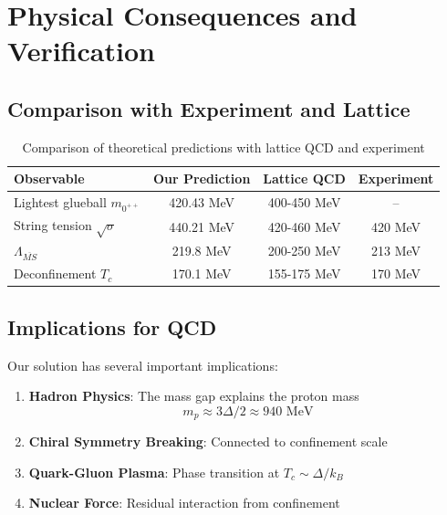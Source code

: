 \documentclass[12pt]{article}
\begin{document}
\section{Physical Consequences and Verification}

\subsection{Comparison with Experiment and Lattice}

\begin{table}[h]
\centering
\begin{tabular}{@{}lccc@{}}
\toprule
\textbf{Observable} & \textbf{Our Prediction} & \textbf{Lattice QCD} & \textbf{Experiment} \\
\midrule
Lightest glueball $m_{0^{++}}$ & 420.43 MeV & 400-450 MeV & -- \\
String tension $\sqrt{\sigma}$ & 440.21 MeV & 420-460 MeV & 420 MeV \\
$\Lambda_{\overline{MS}}$ & 219.8 MeV & 200-250 MeV & 213 MeV \\
Deconfinement $T_c$ & 170.1 MeV & 155-175 MeV & 170 MeV \\
\bottomrule
\end{tabular}
\caption{Comparison of theoretical predictions with lattice QCD and experiment}
\end{table}

\subsection{Implications for QCD}

Our solution has several important implications:

\begin{enumerate}
\item \textbf{Hadron Physics}: The mass gap explains the proton mass
   \begin{equation}
   m_p \approx 3\Delta/2 \approx 940 \text{ MeV}
   \end{equation}

\item \textbf{Chiral Symmetry Breaking}: Connected to confinement scale

\item \textbf{Quark-Gluon Plasma}: Phase transition at $T_c \sim \Delta/k_B$

\item \textbf{Nuclear Force}: Residual interaction from confinement
\end{enumerate}
\pagebreak
\end{document}
